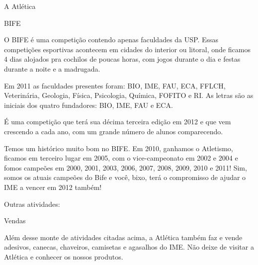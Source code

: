 \begin{secao}{A Atlética}




\begin{subsecao}{BIFE}

O BIFE é uma competição contendo apenas faculdades da USP. Essas competições esportivas acontecem em cidades do interior ou litoral, onde ficamos 4 dias alojados pra cochilos de poucas horas, com jogos durante o dia e festas durante a noite e a madrugada.

Em 2011 as faculdades presentes foram: BIO, IME, FAU, ECA, FFLCH, Veterinária, Geologia, Física, Psicologia, Química, FOFITO e RI. As letras são as iniciais dos quatro fundadores: BIO, IME, FAU e ECA.

É uma competição que terá sua décima terceira edição em 2012 e que vem crescendo a cada ano, com um grande número de alunos comparecendo.

Temos um histórico muito bom no BIFE. Em 2010, ganhamos o Atletismo, ficamos em terceiro lugar em 2005, com o vice-campeonato em 2002 e 2004 e fomos campeões em 2000, 2001, 2003, 2006, 2007, 2008, 2009, 2010 e 2011! Sim, somos os atuais campeões do Bife e você, bixo, terá o compromisso de ajudar o IME a vencer em 2012 também! 


\end{subsecao}

Outras atividades:

\begin{subsecao}{Vendas}

Além desse monte de atividades citadas acima, a Atlética também faz e vende adesivos, canecas, chaveiros, camisetas e agasalhos do IME. Não deixe de visitar a Atlética e conhecer os nossos produtos.


\end{subsecao}
\end{secao}
